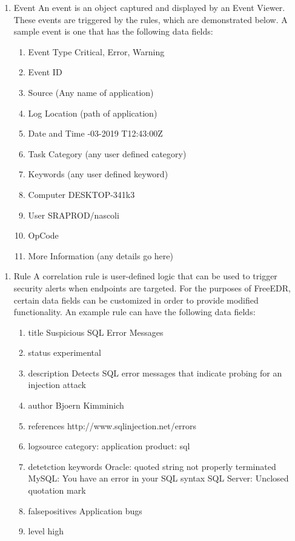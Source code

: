 \documentclass{scrreprt}
\begin{document}
\begin{enumerate}[label*=D\arabic*.]
    \item Event
	\subitem An event is an object captured and displayed by an Event Viewer. These events are triggered by the rules, which are demonstrated below. A sample event is one that has the following data fields:
    \begin{enumerate}[label*=\arabic*.]
	\item Event Type
	\subitem Critical, Error, Warning
	\item Event ID
	\item Source
	\subitem (Any name of application)
	\item Log Location
	\subitem (path of application)
	\item Date and Time
	-03-2019 T12:43:00Z
	\item Task Category
	\subitem (any user defined category)
	\item Keywords
	\subitem (any user defined keyword)
	\item Computer
	\subitem DESKTOP-341k3
	\item User
	\subitem SRAPROD/nascoli
	\item OpCode
	\item More Information
	\subitem (any details go here)

\end{enumerate}
\end{enumerate}


\begin{enumerate}[label*=D\arabic*.]
    \item Rule
	\subitem A correlation rule is user-defined logic that can be used to trigger security alerts when endpoints are targeted. For the purposes of FreeEDR, certain data fields can be customized in order to provide modified functionality. An example rule can have the following data fields:
    \begin{enumerate}[label*=\arabic*.]
	\item title
	\subitem Suspicious SQL Error Messages
	\item status
	\subitem experimental
	\item description
	\subitem Detects SQL error messages that indicate probing for an injection attack
	\item author
	\subitem Bjoern Kimminich
	\item references
	\subitem http://www.sqlinjection.net/errors
	\item logsource
	\subitem   category: application
  	\subitem   product: sql
	\item detetction
	\subitem keywords
	\subitem Oracle: quoted string not properly terminated
	\subitem MySQL: You have an error in your SQL syntax
	\subitem SQL Server: Unclosed quotation mark
	\item falsepositives
	\subitem Application bugs
	\item level
	\subitem high
\end{enumerate}
\end{enumerate}
\end{document}
